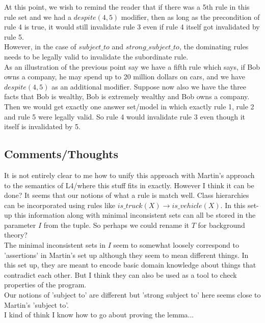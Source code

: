 \newline
At this point, we wish to remind the reader that if there was a 5th rule in this rule set and we had a $despite(4,5)$ modifier, then as long as the precondition of rule 4 is true, it would still invalidate rule 3 even if rule 4 itself got invalidated by rule 5.\\
\newline
However, in the case of $subject\_to$ and $strong\_subject\_to$, the dominating rules needs to be legally valid to invalidate the subordinate rule.\\ 
\newline
As an illustration of the previous point say we have a fifth rule which says, if Bob owns a company, he may spend up to 20 million dollars on cars, and we have $despite(4,5)$ as an additional modifier. Suppose now also we have the three facts that Bob is wealthy, Bob is extremely wealthy and Bob owns a company. Then we would get exactly one answer set/model in which exactly rule 1, rule 2 and rule 5 were legally valid. So rule 4 would invalidate rule 3 even though it itself is invalidated by 5. 
\subsection{Comments/Thoughts}
It is not entirely clear to me how to unify this approach with Martin's approach to the semantics of L4/where this stuff fits in exactly. However I think it can be done? It seems that our notions of what a rule is match well. Class hierarchies can be incorporated using rules like $is\_truck(X)\rightarrow is\_vehicle(X)$. In this set-up this information along with minimal inconsistent sets can all be stored in the parameter $I$ from the tuple. So perhaps we could rename it $T$ for background theory?\\
\newline
The minimal inconsistent sets in $I$ seem to somewhat loosely correspond to 'assertions' in Martin's set up although they seem to mean different things. In this set up, they are meant to encode basic domain knowledge about things that contradict each other. But I think they can also be used as a tool to check properties of the program.\\
\newline
Our notions of 'subject to' are different but 'strong subject to' here seems close to Martin's 'subject to'.\\
\newline
I kind of think I know how to go about proving the lemma...



